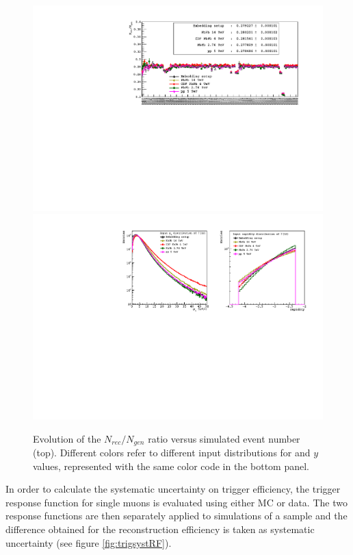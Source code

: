 \begin{figure}[!b]
\begin{center}
\includegraphics[width=\linewidth]{Chapters/Analysis/Figs/Axe/AxE_integrated.pdf}
\includegraphics[width=0.9\linewidth]{Chapters/Analysis/Figs/input_pt_rap_dist.pdf}
\caption{Evolution of the $N_{rec}/N_{gen}$ ratio versus simulated event number (top). Different colors refer to different input distributions for \upsis \pt and $y$ values, represented with the same color code in the bottom panel.}
\label{fig:MCsyst}
\end{center}
\end{figure}

In order to calculate the systematic uncertainty on trigger efficiency, the trigger response function for single muons is evaluated using either MC or data.
The two response functions are then separately applied to simulations of a \upsi sample and the difference obtained for the \upsi reconstruction efficiency is taken as systematic uncertainty (see figure \ref{fig:trigsystRF}).

